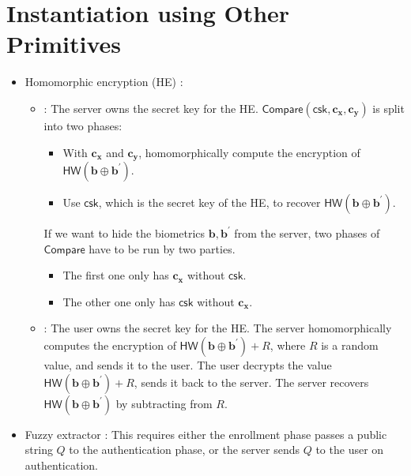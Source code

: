 
\newpage


\section{Instantiation using Other Primitives}

\begin{itemize}
	\item Homomorphic encryption (HE) \cite{10.1007/978-3-642-01957-9_7, 10.1007/978-3-642-40588-4_5, pradel2021privacypreservingbiometricmatchingusing}:
	\begin{itemize}
		\item \cite{10.1007/978-3-642-40588-4_5}: The server owns the secret key for the HE. $\textsf{Compare}(\textsf{csk}, \mathbf{c_x}, \mathbf{c_y})$ is split into two phases:
			\begin{itemize}
				\item With $\mathbf{c_x}$ and $\mathbf{c_y}$, homomorphically compute the encryption of $\textsf{HW}(\mathbf{b} \oplus \mathbf{b}^\prime)$.
				\item Use $\textsf{csk}$, which is the secret key of the HE, to recover $\textsf{HW}(\mathbf{b} \oplus \mathbf{b}^\prime)$.
			\end{itemize}
			If we want to hide the biometrics $\mathbf{b}, \mathbf{b}^\prime$ from the server, two phases of $\textsf{Compare}$ have to be run by two parties.
			\begin{itemize}
				\item The first one only has $\mathbf{c_x}$ without $\textsf{csk}$.
				\item The other one only has $\textsf{csk}$ without $\mathbf{c_x}$.
			\end{itemize}
		\item \cite{10.1007/978-3-642-01957-9_7, pradel2021privacypreservingbiometricmatchingusing}: The user owns the secret key for the HE. The server homomorphically computes the encryption of $\textsf{HW}(\mathbf{b} \oplus \mathbf{b}^\prime) + R$, where $R$ is a random value, and sends it to the user. The user decrypts the value $\textsf{HW}(\mathbf{b} \oplus \mathbf{b}^\prime) + R$, sends it back to the server. The server recovers $\textsf{HW}(\mathbf{b} \oplus \mathbf{b}^\prime)$ by subtracting from $R$.

	\end{itemize}

	\item Fuzzy extractor \cite{10.1145/1030083.1030096, 7980010}: This requires either the enrollment phase passes a public string $Q$ to the authentication phase, or the server sends $Q$ to the user on authentication.


\end{itemize}
